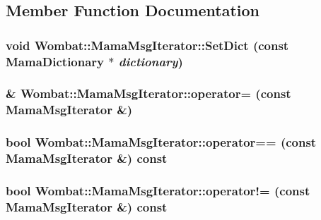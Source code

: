 \subsection{Member Function Documentation}
\hypertarget{classWombat_1_1MamaMsgIterator_af1364d9473c88f1a392a55e90226199e}{
\subsubsection[{SetDict}]{\setlength{\rightskip}{0pt plus 5cm}void Wombat::MamaMsgIterator::SetDict (const {\bf MamaDictionary} $\ast$ {\em dictionary})}}
\label{classWombat_1_1MamaMsgIterator_af1364d9473c88f1a392a55e90226199e}
\hypertarget{classWombat_1_1MamaMsgIterator_ac80cce28d30bf1c71b896e2d633690fe}{
\subsubsection[{operator=}]{\& Wombat::MamaMsgIterator::operator= (const {\bf MamaMsgIterator} \&)}}
\label{classWombat_1_1MamaMsgIterator_ac80cce28d30bf1c71b896e2d633690fe}
\hypertarget{classWombat_1_1MamaMsgIterator_a51f919927ec2559aea74f13dc8ceb5f2}{
\subsubsection[{operator==}]{\setlength{\rightskip}{0pt plus 5cm}bool Wombat::MamaMsgIterator::operator== (const {\bf MamaMsgIterator} \&) const}}
\label{classWombat_1_1MamaMsgIterator_a51f919927ec2559aea74f13dc8ceb5f2}
\hypertarget{classWombat_1_1MamaMsgIterator_ab2cf7ad587e0357a22e9dd12cfc922db}{
\subsubsection[{operator!=}]{\setlength{\rightskip}{0pt plus 5cm}bool Wombat::MamaMsgIterator::operator!= (const {\bf MamaMsgIterator} \&) const}}
